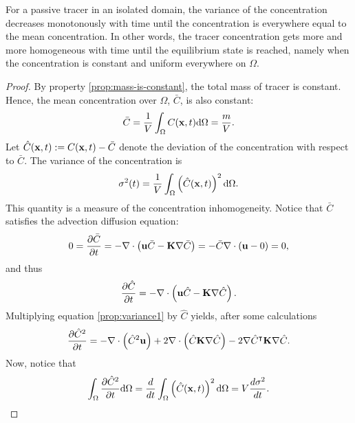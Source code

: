 \begin{property}
	For a passive tracer in an isolated domain, the variance of the concentration decreases monotonously with time until the concentration is everywhere equal to the mean concentration. In other words, the tracer concentration gets more and more homogeneous with time until the equilibrium state is reached, namely when the concentration is constant and uniform everywhere on $\Omega$.
\end{property}
\begin{proof}
	By property \ref{prop:mass-is-constant}, the total mass of tracer is constant. Hence, the mean concentration over $\Omega$, $\bar C$, is also constant:
	\begin{equation}
	 	\bar C = \frac{1}{V} \int_{\Omega} C(\mathbf x,t) \mathrm d\Omega = \frac{m}{V}.
	 \end{equation} 
	 Let $\hat C(\mathbf x,t) := C(\mathbf x,t) - \bar C$ denote the deviation of the concentration with respect to $\bar C$. The variance of the concentration is
	 \begin{equation}
	 	\sigma^2(t) = \frac{1}{V} \int_{\Omega} \left(\hat C(\mathbf x,t)\right)^2 \mathrm d\Omega.
	 \end{equation}
	 This quantity is a measure of the concentration inhomogeneity. Notice that $\bar C$ satisfies the advection diffusion equation:
	 \begin{equation}
	 	0 = \frac{\partial \bar C}{\partial t} = -\nabla \cdot \left(\mathbf u \bar C - \mathbf K \nabla \bar C\right) = - \bar C \nabla \cdot (\mathbf u - 0) = 0,
	 \end{equation}
	 and thus
	 \begin{equation} \label{prop:variance1}
	 	\frac{\partial \hat C}{\partial t} = -\nabla \cdot \left(\mathbf u \hat C - \mathbf K \nabla \hat C\right).
	 \end{equation}
	 Multiplying equation \eqref{prop:variance1} by $\hat C$ yields, after some calculations
	 \begin{equation} \label{prop:variance2}
	 	\frac{\partial \hat C^2}{\partial t} = - \nabla \cdot \left(\hat C^2 \mathbf u \right) + 2\nabla \cdot \left(\hat C \mathbf K \nabla \hat C \right) - 2 \nabla \hat C^\intercal \mathbf K \nabla \hat C.
	 \end{equation}
	 Now, notice that
	 \begin{equation} \label{prop:variance3}
	 	\int_{\Omega} \frac{\partial \hat C^2}{\partial t} \mathrm d\Omega = \frac{d}{dt} \int_{\Omega} \left( \hat C(\mathbf x,t) \right)^2 \mathrm d\Omega = V\frac{d\sigma^2}{dt}.
	 \end{equation}

\end{proof}
